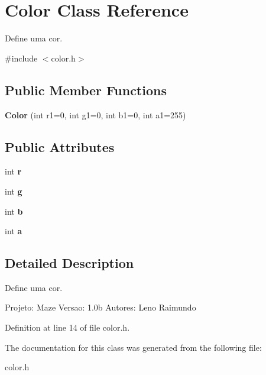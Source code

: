 \hypertarget{class_color}{}\section{Color Class Reference}
\label{class_color}


Define uma cor.  




{\ttfamily \#include $<$color.\+h$>$}

\subsection*{Public Member Functions}
\begin{DoxyCompactItemize}
\item 
\hypertarget{class_color_a533ecd09f91344bb2b3dd1cd793dfdfe}{}{\bfseries Color} (int r1=0, int g1=0, int b1=0, int a1=255)\label{class_color_a533ecd09f91344bb2b3dd1cd793dfdfe}

\end{DoxyCompactItemize}
\subsection*{Public Attributes}
\begin{DoxyCompactItemize}
\item 
\hypertarget{class_color_a4954bdc9772da2a610401b8a438125cb}{}int {\bfseries r}\label{class_color_a4954bdc9772da2a610401b8a438125cb}

\item 
\hypertarget{class_color_ab5656e995bddd43d286c7ff5629a31dd}{}int {\bfseries g}\label{class_color_ab5656e995bddd43d286c7ff5629a31dd}

\item 
\hypertarget{class_color_ae11f00d34bf3ecd8c8278f68876b82bf}{}int {\bfseries b}\label{class_color_ae11f00d34bf3ecd8c8278f68876b82bf}

\item 
\hypertarget{class_color_aa85f0a7c4980f26d7799dbbc8c1f7aa2}{}int {\bfseries a}\label{class_color_aa85f0a7c4980f26d7799dbbc8c1f7aa2}

\end{DoxyCompactItemize}


\subsection{Detailed Description}
Define uma cor. 

Projeto\+: Maze Versao\+: 1.\+0b Autores\+: Leno Raimundo 

Definition at line 14 of file color.\+h.



The documentation for this class was generated from the following file\+:\begin{DoxyCompactItemize}
\item 
color.\+h\end{DoxyCompactItemize}
